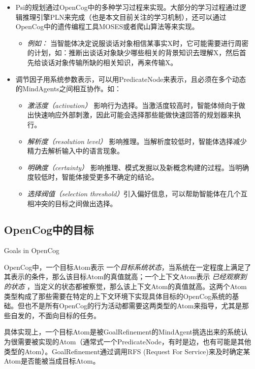 \begin{itemize}
\item Psi的规划通过OpenCog中的多种学习过程来实现。大部分的学习过程通过逻辑推理引擎PLN来完成（也是本文目前关注的学习机制），还可以通过OpenCog中的遗传编程工具MOSES或者爬山算法等来实现。
\begin{itemize}
\item {\it 例如：} 当智能体决定说服谈话对象相信某事实X时，它可能需要进行周密的计划，如：推断出谈话对象缺少哪些相关的背景知识去理解X，然后首先给谈话对象传输所缺的相关知识，再来传输X。

\end{itemize}

\item 调节因子用系统参数表示，可以用PredicateNode来表示，且必须在多个动态的MindAgents之间相互协作。如：
\begin{itemize}
\item {\it 激活度（activation）} 影响行为选择。当激活度较高时，智能体倾向于做出快速响应外部刺激，因此可能会选择那些能做快速回答的规划器来执行。
\item {\it 解析度（resolution level）} 影响推理。当解析度较低时，智能体选择减少精力去解析输入中的语言现象。
\item {\it 明确度（certainty）} 影响推理、模式发掘以及新概念构建的过程。当明确度较低时，智能体接受更多不确定的结论。
\item {\it 选择阀值（selection threshold）}引入偏好信息，可以帮助智能体在几个互相冲突的目标之间做出选择。
\end{itemize}
\end{itemize}

\subsection{OpenCog中的目标}{Goals in OpenCog}

OpenCog中，一个目标Atom表示 一个\textit{目标系统状态}，当系统在一定程度上满足了其表示的条件，那么该目标Atom的真值就高；一个上下文Atom表示 \textit{已经观察到的状态} ，当定义的状态都被察觉，那么该上下文Atom的真值就高。这两个Atom类型构成了那些需要在特定的上下文环境下实现具体目标的OpenCog系统的基础。但也不是所有OpenCog的行为活动都需要这两类型的Atom来指导，尤其是那些自发的，不面向目标的任务。

具体实现上，一个目标Atom是被GoalRefinement的MindAgent挑选出来的系统认为很需要被实现的Atom（通常式一个PredicateNode，有时是边，也有可能是其他类型的Atom）。GoalRefinement通过调用RFS (Request For Service)来及时确定某Atom是否能被当成目标Atom。

